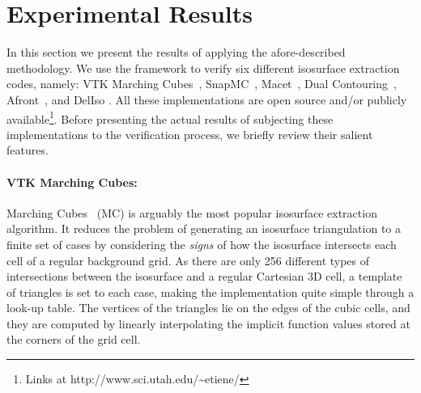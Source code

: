 \section{Experimental Results}
\label{chap1:sec:res}


In this section we present the results of applying the afore-described 
methodology. We use the framework to verify six different isosurface 
extraction codes, namely: VTK Marching Cubes~\cite{lor87},
SnapMC~\cite{Raman:2008:QIM}, Macet~\cite{Dietrich:TVCG:2008},
Dual Contouring~\cite{Ju02}, Afront~\cite{Schreiner06},
and DelIso \cite{Dey07}. All these
implementations are open source and/or publicly 
available\footnote{Links at http://www.sci.utah.edu/\textasciitilde etiene/}.
Before presenting the actual results of subjecting these
implementations to the verification process,
we briefly review their salient features.



\paragraph*{VTK Marching Cubes:} Marching Cubes~\cite{lor87} (MC) is
arguably the most popular isosurface extraction algorithm.
It reduces the problem of generating an isosurface triangulation
to a finite set of cases by considering the \emph{signs} of 
how the isosurface intersects each cell of a regular background grid.
As there are only 256 different
types of intersections between the isosurface and a regular Cartesian 3D cell, 
a template of triangles is set to each case, making the implementation quite simple 
through a look-up table. The vertices of the triangles lie on 
the edges of the cubic cells, and they are computed by linearly interpolating 
the implicit function values stored at the corners of the grid cell. 

